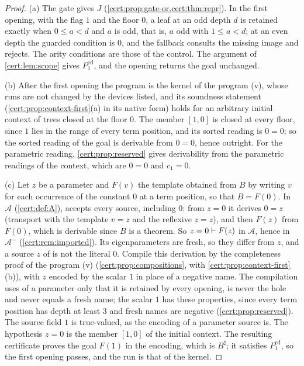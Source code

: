\begin{proof}
(a) The gate gives $J$ (\cref{cert:prop:gate-or,cert:thm:repr}). In the first
opening, with the flag $1$ and the floor $0$, a leaf at an odd depth $d$ is
retained exactly when $0\le a<d$ and $a$ is odd, that is, $a$ odd with
$1\le a<d$; at an even depth the guarded condition is $0$, and the fallback
consults the missing image and rejects. The arity conditions are those of the
control. The argument of \cref{cert:lem:scope} gives $P^{\mathrm{ed}}_{1}$, and
the opening returns the goal unchanged.

(b) After the first opening the program is the kernel of the program (v), whose
runs are not changed by the devices listed, and its soundness statement
(\cref{cert:prop:context-first}(a) in its native form) holds for an arbitrary
initial context of trees closed at the floor $0$. The member $[1,0]$ is closed
at every floor, since $1$ lies in the range of every term position, and its
sorted reading is $0=0$; so the sorted reading of the goal is derivable from
$0=0$, hence outright. For the parametric reading, \cref{cert:prop:reserved}
gives derivability from the parametric readings of the context, which are
$0=0$ and $c_1=0$.

(c) Let $z$ be a parameter and $F(v)$ the template obtained from $B$ by writing
$v$ for each occurrence of the constant $0$ at a term position, so that
$B=F(0)$. In $\mathcal A$ (\cref{cert:def:A}),  accepts every source,
including $0$: from $z=0$ it derives $0=z$ (transport with the template
$v=z$ and the reflexive $z=z$), and then $F(z)$ from $F(0)$, which is derivable
since $B$ is a theorem. So $z=0\vdash F(z)$ in $\mathcal A$, hence in
$\mathcal A^{-}$ (\cref{cert:rem:imported}). Its eigenparameters are fresh, so
they differ from $z$, and a source $z$ of  is not the literal $0$.
Compile this derivation by the completeness proof of the program
(v) (\cref{cert:prop:compositions}, with \cref{cert:prop:context-first}(b)),
with $z$ encoded by the scalar $1$ in place of a negative name. The compilation
uses of a parameter only that it is retained by every opening, is never the hole
and never equals a fresh name; the scalar $1$ has these properties, since every
term position has depth at least $3$ and fresh names are negative
(\cref{cert:prop:reserved}). The source field $1$ is true-valued, as the
encoding of a parameter source is. The hypothesis $z=0$ is the member $[1,0]$
of the initial context. The resulting certificate proves the goal $F(1)$ in the
encoding, which is $B^{\sharp}$; it satisfies $P^{\mathrm{ed}}_{1}$, so the
first opening passes, and the run is that of the kernel.
\end{proof}

